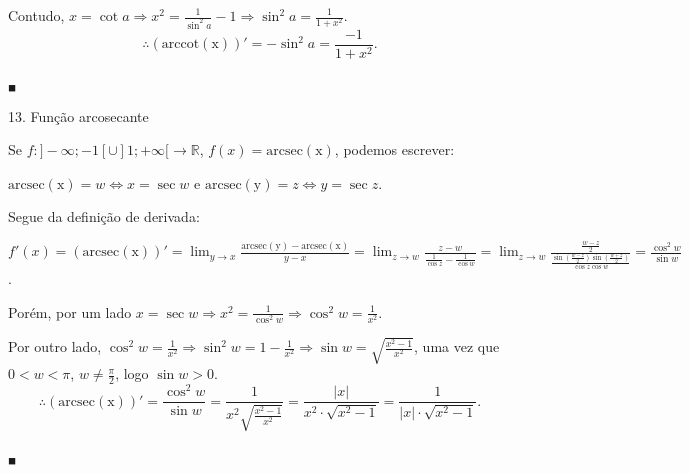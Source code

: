 \documentclass{article}
\begin{document}
{\begin{newpage}
\par Contudo, $x=\cot{a}\Rightarrow x^2 =\displaystyle{\frac{1}{\sin^2{a}} - 1\Rightarrow \sin^2{a}=\frac{1}{1+x^2}}$.
\vspace{0.3cm}
$$\therefore (\operatorname{arccot(x)})' = -\sin^2{a} =\frac{-1}{1+x^2}.$$
\begin{flushright} $_{\blacksquare }$ \end{flushright}
\par
\vspace{0.3cm}
\begin{flushleft}
13. Função arcosecante
\end{flushleft}
\par Se $f:]-\infty ;-1[ \cup ]1;+\infty[\rightarrow\mathbb{R}$, $f(x)=\operatorname{arcsec(x)}$, podemos escrever:
\par \begin{center} $\operatorname{arcsec(x)} = w\Leftrightarrow x=\sec{w}$ e $\operatorname{arcsec(y)}=z\Leftrightarrow y=\sec{z}$.\end{center}
\vspace{0.3cm}
\par Segue da definição de derivada:
\par $f'(x)=(\operatorname{arcsec(x)})'=\displaystyle{\lim_{y\to x}} \frac{\operatorname{arcsec(y)} - \operatorname{arcsec(x)}}{y-x} =  \displaystyle{\lim_{z\to w}} \frac{z-w}{\frac{1}{\cos{z}} - \frac{1}{\cos{w}}} = \displaystyle{\lim_{z\to w}} \frac{\frac{w-z}{2}}{\frac{\sin{(\frac{w-z}{2})}\sin{(\frac{w+z}{2})}}{\cos{z}\cos{w}}} = \frac{\cos^2{w}}{\sin{w}}$.
\vspace{0.3cm}
\par Porém, por um lado $x=\sec{w}\Rightarrow\displaystyle{x^2=\frac{1}{\cos^2{w}}\Rightarrow \cos^2{w}=\frac{1}{x^2}}$.
\vspace{0.3cm}
\par Por outro lado, $\displaystyle{\cos^2{w}=\frac{1}{x^2}\Rightarrow \sin^2{w}=1-\frac{1}{x^2}\Rightarrow \sin{w}=\sqrt{\frac{x^2 - 1}{x^2}}}$, uma vez que $0<w<\pi$, $w\neq\displaystyle{\frac{\pi}{2}}$, logo $\sin{w}>0$.
\vspace{0.3cm}
$$\therefore (\operatorname{arcsec(x)})'=\frac{\cos^2{w}}{\sin{w}}=\frac{1}{x^2\sqrt{\frac{x^2 - 1}{x^2}}} =\frac{|x|}{x^2\cdot\sqrt{x^2 - 1}} = \frac{1}{|x|\cdot\sqrt{x^2-1}}.$$
\begin{flushright} $_{\blacksquare }$ \end{flushright}
\par
\vspace{0.3cm}

\end{newpage}}
\end{document}
